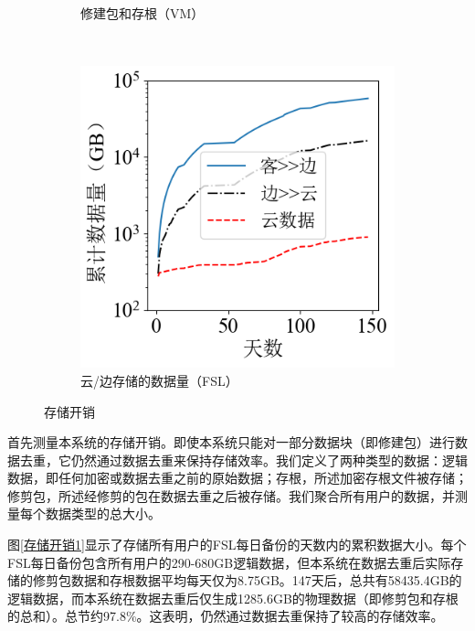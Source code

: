 \documentclass[promaster]{thesis-uestc}
\begin{document}
\begin{figure}
\begin{subfigure}{0.40\textwidth}
        \centering
        \captionsetup{width=\textwidth}
        \caption{修建包和存根（VM）}
        \label{存储开销4}
    \end{subfigure}\\
    \begin{subfigure}{0.40\textwidth}
        \includegraphics[width=1\linewidth]{pic/fsl_edge_cloud.png}
        \centering
        \captionsetup{width=\textwidth}
        \caption{云/边存储的数据量（FSL）}
        \label{存储开销5}
    \end{subfigure}
    \caption{存储开销}
    \label{存储开销}
\end{figure}

首先测量本系统的存储开销。即使本系统只能对一部分数据块（即修建包）进行数据去重，它仍然通过数据去重来保持存储效率。我们定义了两种类型的数据：逻辑数据，即任何加密或数据去重之前的原始数据；存根，所述加密存根文件被存储；修剪包，所述经修剪的包在数据去重之后被存储。我们聚合所有用户的数据，并测量每个数据类型的总大小。

图\ref{存储开销1}显示了存储所有用户的FSL每日备份的天数内的累积数据大小。每个FSL每日备份包含所有用户的290-680GB逻辑数据，但本系统在数据去重后实际存储的修剪包数据和存根数据平均每天仅为8.75GB。147天后，总共有58435.4GB的逻辑数据，而本系统在数据去重后仅生成1285.6GB的物理数据（即修剪包和存根的总和）。总节约97.8\%。这表明，仍然通过数据去重保持了较高的存储效率。
\end{document}
